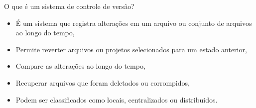 \documentclass[12pt]{beamer}
\begin{document}



\begin{frame}{O que é um sistema de controle de versão? }
	\begin{itemize}
		\item É um sistema que registra alterações em um arquivo ou conjunto de arquivos ao longo do tempo,
		\item Permite reverter arquivos ou projetos selecionados para um estado anterior,
		\item Compare as alterações ao longo do tempo,
		\item Recuperar arquivos que foram deletados ou corrompidos,
		\item Podem ser classificados como locais, centralizados ou distribuidos. 
	\end{itemize}
\end{frame}

\end{document}
